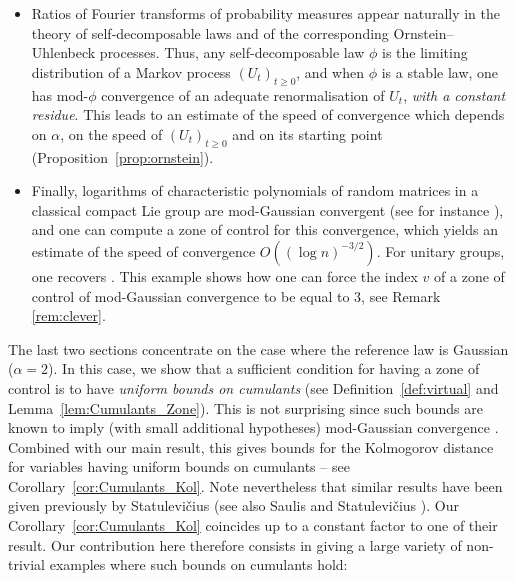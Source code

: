 \documentclass[envcountsame]{svmult}
\begin{document}
\begin{itemize}
    \item Ratios of Fourier transforms of probability measures appear naturally in the theory of self-decom\-pos\-able laws and of the corresponding Ornstein--Uhlenbeck processes. Thus, any self-decomposable law $\phi$ is the limiting distribution of a Markov process $(U_t)_{t \geq 0}$, and when $\phi$ is a stable law, one has mod-$\phi$ convergence of an adequate renormalisation of $U_t$, \emph{with a constant residue}. This leads to an estimate of the speed of convergence which depends on $\alpha$, on the speed of $(U_t)_{t \geq 0}$ and on its starting point (Proposition~\ref{prop:ornstein}).

    \item Finally, logarithms of characteristic polynomials of random matrices in a classical compact Lie group are mod-Gaussian convergent (see for instance \cite[Section 7.5]{FMN16}), and one can compute a zone of control for this convergence, which yields an estimate of the speed of convergence $O((\log n)^{-3/2})$. For unitary groups, one recovers \cite[Proposition 5.2]{BHNY08}. This example shows how one can force the index $v$ of a zone of control of mod-Gaussian convergence to be equal to $3$, see Remark \ref{rem:clever}.
\end{itemize}
\vspace{2mm}


The last two sections concentrate on the case where the reference law is Gaussian ($\alpha=2$).
In this case, we show that a sufficient condition for having a zone of control is 
to have {\em uniform bounds on cumulants} (see Definition~\ref{def:virtual} and Lemma~\ref{lem:Cumulants_Zone}).
This is not surprising since such bounds are known to imply (with small additional hypotheses)
mod-Gaussian convergence \cite[Section 5.1]{FMN16}.
Combined with our main result, this gives bounds for the Kolmogorov distance
for variables having uniform bounds on cumulants -- see Corollary~\ref{cor:Cumulants_Kol}. Note nevertheless that similar results have been given previously by Statulevi\v{c}ius \cite{Sta66}
(see also Saulis and Statulevi\v{c}ius \cite{LivreOrange:Cumulants}).
Our Corollary~\ref{cor:Cumulants_Kol} coincides up to a constant factor to
one of their result. Our contribution here therefore consists in giving
a large variety of non-trivial examples where such bounds on cumulants hold:
\end{document}
